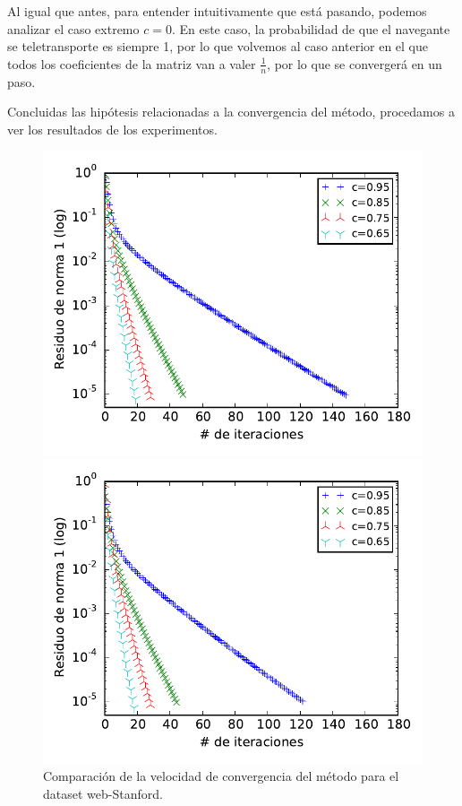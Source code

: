 Al igual que antes, para entender intuitivamente que está pasando, podemos analizar el caso extremo $c = 0$. En este caso, la probabilidad de que el navegante se teletransporte es siempre 1, por lo que volvemos al caso anterior en el que todos los coeficientes de la matriz van a valer $\frac1n$, por lo que se convergerá en un paso.

Concluidas las hipótesis relacionadas a la convergencia del método, procedamos a ver los resultados de los experimentos.


\begin{figure}[H]
\centering
\begin{minipage}{0.48\textwidth}
  \centering
    \includegraphics[width=1\textwidth]{imgs/convergencia-stanford.pdf}
  \caption{\footnotesize{Comparación de la velocidad de convergencia del método para el dataset web-Stanford.}}
  \label{fig:conv1}
\end{minipage}
\hspace{0.02\textwidth}
\begin{minipage}{0.48\textwidth}
  \centering
    \includegraphics[width=1\textwidth]{imgs/convergencia-notredame.pdf}

\end{minipage}
\end{figure}
